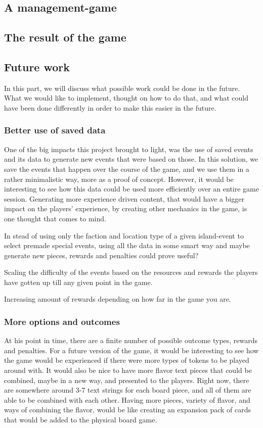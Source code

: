 \subsection{A management-game}
\subsection{The result of the game}
\subsection{Future work}
In this part, we will discuss what possible work could be done in the future. What we would like to implement, thought on how to do that, and what could have been done differently in order to make this easier in the future.
\subsubsection{Better use of saved data}
One of the big impacts this project brought to light, was the use of saved events and its data to generate new events that were based on those. In this solution, we save the events that happen over the course of the game, and we use them in a rather minimalistic way, more as a proof of concept. However, it would be interesting to see how this data could be used more efficiently over an entire game session. Generating more experience driven content, that would have a bigger impact on the players' experience, by creating other mechanics in the game, is one thought that comes to mind. 

In stead of using only the faction and location type of a given island-event to select premade special events, using all the data in some smart way and maybe generate new pieces, rewards and penalties could prove useful? 

Scaling the difficulty of the events based on the resources and rewards the players have gotten up till any given point in the game.

Increasing amount of rewards depending on how far in the game you are.

\subsubsection{More options and outcomes}
At his point in time, there are a finite number of possible outcome types, rewards and penalties. For a future version of the game, it would be interesting to see how the game would be experienced if there were more types of tokens to be played around with. It would also be nice to have more flavor text pieces that could be combined, maybe in a new way, and presented to the players. Right now, there are somewhere around 3-7 text strings for each board piece, and all of them are able to be combined with each other. Having more pieces, variety of flavor, and ways of combining the flavor, would be like creating an expansion pack of cards that would be added to the physical board game. 

